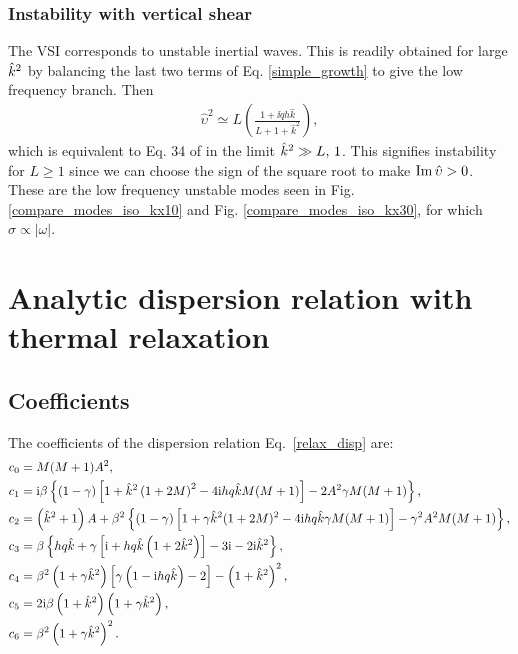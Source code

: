 \subsubsection{Instability with vertical shear}
The VSI corresponds to unstable inertial waves. This
is readily obtained for large $\hat{k}^2$ by balancing
the last two terms of Eq. \ref{simple_growth} to give the low
frequency branch. Then 
\begin{align}
  \hat{\upsilon}^2 \simeq L\left(\frac{1+\ii q h
       \hat{k}}{L+1+\hat{k}^2}\right), \label{simple_growth2}
\end{align}
which is equivalent to Eq. 34 of  in the limit
$\hat{k}^2\gg L,\,1$. This signifies instability for
$L\geq1$ since we can choose the sign 
of the square root to make $\operatorname{Im}\hat{\upsilon}>0$.  These
are the low frequency unstable modes seen in
Fig. \ref{compare_modes_iso_kx10} and
Fig. \ref{compare_modes_iso_kx30}, for which $\sigma\propto|\omega|$.  

\section{Analytic dispersion relation
with thermal relaxation}
\subsection{Coefficients}\label{relax_coeff}
The coefficients of the dispersion relation Eq.\ \ref{relax_disp} are:
\begin{subequations}\label{coeffs}\begin{align}
  &c_0 = M(M+1)A^2,\\
  &c_1 = \mathrm{i}\beta\left\{\left(1-\gamma\right)\left[1 +
      \hat{k}^2\left(1+2M\right)^2 - 4 \mathrm{i} h q\hat{k} M (M+1)\right] 
    - 2A^2\gamma M (M+1)\right\},\\
  &c_2 = \left(\hat{k}^2 + 1\right)A + \beta^2\left\{(1-\gamma)\left[1
      + \gamma \hat{k}^2(1+2M)^2 - 4\mathrm{i} h q \hat{k} \gamma M(M+1)
    \right]
    -\gamma^2 A^2 M(M+1)
  \right\},\\
  &c_3 = \beta\left\{h q \hat{k} + \gamma \left[\mathrm{i} + h q
      \hat{k} \left(1+2\hat{k}^2\right)\right] - 3\mathrm{i} - 2\mathrm{i}
    \hat{k}^2\right\},\\
  &c_4 =
  \beta^2\left(1+\gamma\hat{k}^2\right)\left[\gamma\left(1-\mathrm{i} h q
    \hat{k}\right)-2\right] - \left(1+\hat{k}^2\right)^2,\\
&c_5 = 2\mathrm{i}\beta\left(1+\hat{k}^2\right)\left(1+\gamma\hat{k}^2\right),\\
&c_6 = \beta^2\left(1+\gamma\hat{k}^2\right)^2.
\end{align}\end{subequations}

